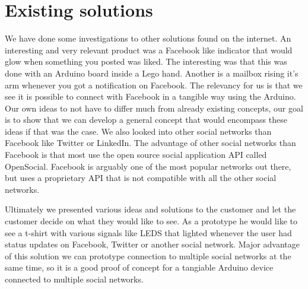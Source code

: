 \section{Existing solutions}

We have done some investigations to other solutions found on the internet. An interesting and very relevant product was a Facebook like indicator that would glow when something you posted was liked. The interesting was that this was done with an Arduino board inside a Lego hand. Another is a mailbox rising it’s arm whenever you got a notification on Facebook. The relevancy for us is that we see it is possible to connect with Facebook in a tangible way using the Arduino. Our own ideas to not have to differ much from already existing concepts, our goal is to show that we can develop a general concept that would encompass these ideas if that was the case. We also looked into other social networks than Facebook like Twitter or LinkedIn. The advantage of other social networks than Facebook is that most use the open source social application API called OpenSocial. Facebook is arguably one of the most popular networks out there, but uses a proprietary API that is not compatible with all the other social networks.

Ultimately we presented various ideas and solutions to the customer and let the customer decide on what they would like to see. As a prototype he would like to see a t-shirt with various signals like LEDS that lighted whenever the user had status updates on Facebook, Twitter or another social network. Major advantage of this solution we can prototype connection to multiple social networks at the same time, so it is a good proof of concept for a tangiable Arduino device connected to multiple social networks.